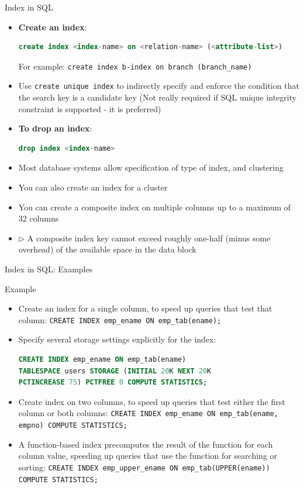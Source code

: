 \documentclass[aspectratio=169, xcolor=dvipsnames]{beamer}
\begin{document}
\begin{frame}[fragile]{Index in SQL}
    \begin{itemize}[<+->]
        \item \textbf{Create an index}:
        \begin{lstlisting}[language=SQL]
create index <index-name> on <relation-name> (<attribute-list>)
        \end{lstlisting}
        For example: \texttt{create index b-index on branch (branch\_name)}
        \item Use \texttt{create unique index} to indirectly specify and enforce the condition that the search key is a candidate key (Not really required if SQL unique integrity constraint is supported - it is preferred)
        \item \textbf{To drop an index}:
        \begin{lstlisting}[language=SQL]
drop index <index-name>
        \end{lstlisting}
        \item Most database systems allow specification of type of index, and clustering
        \item You can also create an index for a cluster
        \item You can create a composite index on multiple columns up to a maximum of 32 columns
        \item $\triangleright$ A composite index key cannot exceed roughly one-half (minus some overhead) of the available space in the data block
    \end{itemize}
\end{frame}

\begin{frame}[fragile]{Index in SQL: Examples}
    \begin{exampleblock}{Example}
        \begin{itemize}[<+->]
            \item Create an index for a single column, to speed up queries that test that column:
            \verb|CREATE INDEX emp_ename ON emp_tab(ename);|
            \item Specify several storage settings explicitly for the index:
            \begin{lstlisting}[language=SQL]
CREATE INDEX emp_ename ON emp_tab(ename)
TABLESPACE users STORAGE (INITIAL 20K NEXT 20K
PCTINCREASE 75) PCTFREE 0 COMPUTE STATISTICS;
            \end{lstlisting}
            \item Create index on two columns, to speed up queries that test either the first column or both columns:
            \verb|CREATE INDEX emp_ename ON emp_tab(ename, empno) COMPUTE STATISTICS;|
            \item A function-based index precomputes the result of the function for each column value, speeding up queries that use the function for searching or sorting:
            \verb|CREATE INDEX emp_upper_ename ON emp_tab(UPPER(ename)) COMPUTE STATISTICS;|
        \end{itemize}
    \end{exampleblock}
\end{frame}
\end{document}
